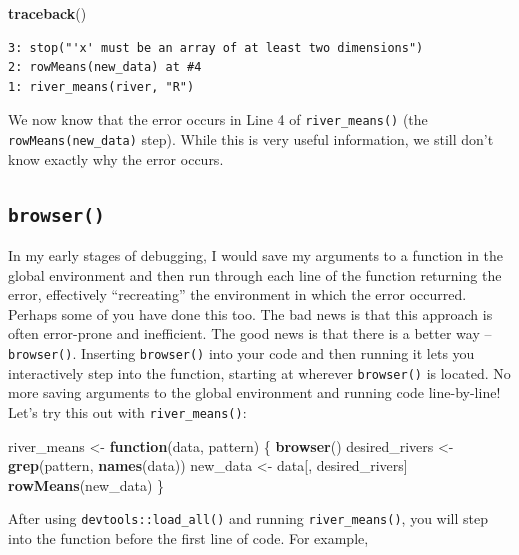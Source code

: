\documentclass[
]{book}
\newenvironment{Shaded}{\begin{snugshade}}{\end{snugshade}}
\newcommand{\ControlFlowTok}[1]{\textcolor[rgb]{0.13,0.29,0.53}{\textbf{#1}}}
\newcommand{\KeywordTok}[1]{\textcolor[rgb]{0.13,0.29,0.53}{\textbf{#1}}}
\newcommand{\NormalTok}[1]{#1}
\newcommand{\StringTok}[1]{\textcolor[rgb]{0.31,0.60,0.02}{#1}}
\begin{document}
\begin{Shaded}
\begin{Highlighting}[]
\KeywordTok{traceback}\NormalTok{()}
\end{Highlighting}
\end{Shaded}

\begin{verbatim}
3: stop("'x' must be an array of at least two dimensions")
2: rowMeans(new_data) at #4
1: river_means(river, "R")
\end{verbatim}

We now know that the error occurs in Line 4 of \texttt{river\_means()} (the \texttt{rowMeans(new\_data)} step). While this is very useful information, we still don't know exactly why the error occurs.

\hypertarget{browser}{%
\subsection{\texorpdfstring{\texttt{browser()}}{browser()}}\label{browser}}

In my early stages of debugging, I would save my arguments to a function in the global environment and then run through each line of the function returning the error, effectively ``recreating'' the environment in which the error occurred. Perhaps some of you have done this too. The bad news is that this approach is often error-prone and inefficient. The good news is that there is a better way -- \texttt{browser()}. Inserting \texttt{browser()} into your code and then running it lets you interactively step into the function, starting at wherever \texttt{browser()} is located. No more saving arguments to the global environment and running code line-by-line! Let's try this out with \texttt{river\_means()}:

\begin{Shaded}
\begin{Highlighting}[]
\NormalTok{river_means <-}\StringTok{ }\ControlFlowTok{function}\NormalTok{(data, pattern) \{}
  \KeywordTok{browser}\NormalTok{()}
\NormalTok{  desired_rivers <-}\StringTok{ }\KeywordTok{grep}\NormalTok{(pattern, }\KeywordTok{names}\NormalTok{(data))}
\NormalTok{  new_data <-}\StringTok{ }\NormalTok{data[, desired_rivers]}
  \KeywordTok{rowMeans}\NormalTok{(new_data)}
\NormalTok{\}}
\end{Highlighting}
\end{Shaded}

After using \texttt{devtools::load\_all()} and running \texttt{river\_means()}, you will step into the function before the first line of code. For example,
\end{document}
